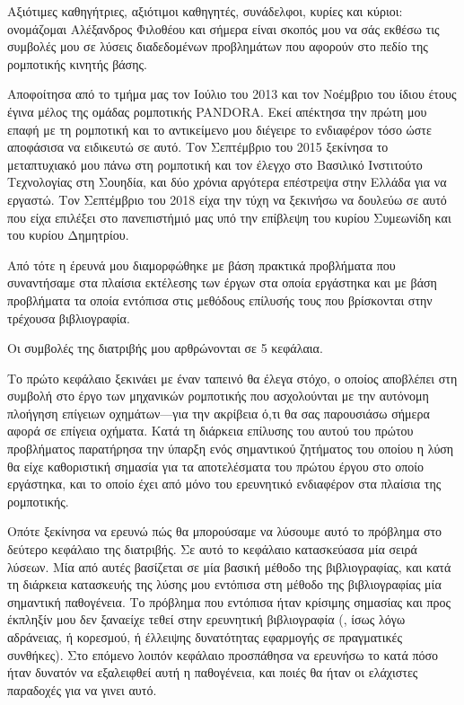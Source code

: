 \documentclass[a4paper,10pt]{article}
\begin{document}
Αξιότιμες καθηγήτριες, αξιότιμοι καθηγητές, συνάδελφοι, κυρίες και κύριοι:
ονομάζομαι Αλέξανδρος Φιλοθέου και σήμερα είναι σκοπός μου να σάς εκθέσω τις
συμβολές μου σε λύσεις διαδεδομένων προβλημάτων που αφορούν στο πεδίο της
ρομποτικής κινητής βάσης.

Αποφοίτησα από το τμήμα μας τον Ιούλιο του 2013 και τον Νοέμβριο του ίδιου
έτους έγινα μέλος της ομάδας ρομποτικής PANDORA. Εκεί απέκτησα την πρώτη μου
επαφή με τη ρομποτική και το αντικείμενο μου διέγειρε το ενδιαφέρον τόσο ώστε
αποφάσισα να ειδικευτώ σε αυτό. Τον Σεπτέμβριο του 2015 ξεκίνησα το
μεταπτυχιακό μου πάνω στη ρομποτική και τον έλεγχο στο Βασιλικό Ινστιτούτο
Τεχνολογίας στη Σουηδία, και δύο χρόνια αργότερα επέστρεψα στην Ελλάδα για να
εργαστώ. Τον Σεπτέμβριο του 2018 είχα την τύχη να ξεκινήσω να δουλεύω σε αυτό
που είχα επιλέξει στο πανεπιστήμιό μας υπό την επίβλεψη του κυρίου Συμεωνίδη
και του κυρίου Δημητρίου.

Από τότε η έρευνά μου διαμορφώθηκε με βάση πρακτικά προβλήματα που
συναντήσαμε στα πλαίσια εκτέλεσης των έργων στα οποία εργάστηκα και με βάση
προβλήματα τα οποία εντόπισα στις μεθόδους επίλυσής τους που βρίσκονται στην
τρέχουσα βιβλιογραφία.

Οι συμβολές της διατριβής μου αρθρώνονται σε 5 κεφάλαια.

Το πρώτο κεφάλαιο ξεκινάει με έναν ταπεινό θα έλεγα στόχο, ο οποίος αποβλέπει
στη συμβολή στο έργο των μηχανικών ρομποτικής που ασχολούνται με την αυτόνομη
πλοήγηση επίγειων οχημάτων---για την ακρίβεια ό,τι θα σας παρουσιάσω σήμερα
αφορά σε επίγεια οχήματα. Κατά τη διάρκεια επίλυσης του αυτού του πρώτου
προβλήματος παρατήρησα την ύπαρξη ενός σημαντικού ζητήματος του οποίου η λύση
θα είχε καθοριστική σημασία για τα αποτελέσματα του πρώτου έργου στο οποίο
εργάστηκα, και το οποίο έχει από μόνο του ερευνητικό ενδιαφέρον στα πλαίσια της
ρομποτικής.

Οπότε ξεκίνησα να ερευνώ πώς θα μπορούσαμε να λύσουμε αυτό το πρόβλημα στο
δεύτερο κεφάλαιο της διατριβής.  Σε αυτό το κεφάλαιο κατασκεύασα μία σειρά
λύσεων. Μία από αυτές βασίζεται σε μία βασική μέθοδο της βιβλιογραφίας, και
κατά τη διάρκεια κατασκευής της λύσης μου εντόπισα στη μέθοδο της βιβλιογραφίας
μία σημαντική παθογένεια. Το πρόβλημα που εντόπισα ήταν κρίσιμης σημασίας και
προς έκπληξίν μου δεν ξαναείχε τεθεί στην ερευνητική βιβλιογραφία (, ίσως λόγω
αδράνειας, ή κορεσμού, ή έλλειψης δυνατότητας εφαρμογής σε πραγματικές
συνθήκες). Στο επόμενο λοιπόν κεφάλαιο προσπάθησα να ερευνήσω το κατά πόσο ήταν
δυνατόν να εξαλειφθεί αυτή η παθογένεια, και ποιές θα ήταν οι ελάχιστες
παραδοχές για να γινει αυτό.
\end{document}
